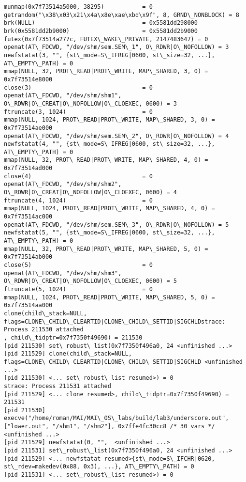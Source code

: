 \documentclass[a4paper, 12pt]{article}
\begin{document}
\begin{lstlisting}
munmap(0x7f73514a5000, 38295)           = 0
getrandom("\x38\x03\x21\x4a\x8e\xae\xbd\x9f", 8, GRND\_NONBLOCK) = 8
brk(NULL)                               = 0x5581dd298000
brk(0x5581dd2b9000)                     = 0x5581dd2b9000
futex(0x7f73514a277c, FUTEX\_WAKE\_PRIVATE, 2147483647) = 0
openat(AT\_FDCWD, "/dev/shm/sem.SEM\_1", O\_RDWR|O\_NOFOLLOW) = 3
newfstatat(3, "", {st\_mode=S\_IFREG|0600, st\_size=32, ...}, AT\_EMPTY\_PATH) = 0
mmap(NULL, 32, PROT\_READ|PROT\_WRITE, MAP\_SHARED, 3, 0) = 0x7f73514e8000
close(3)                                = 0
openat(AT\_FDCWD, "/dev/shm/shm1", O\_RDWR|O\_CREAT|O\_NOFOLLOW|O\_CLOEXEC, 0600) = 3
ftruncate(3, 1024)                      = 0
mmap(NULL, 1024, PROT\_READ|PROT\_WRITE, MAP\_SHARED, 3, 0) = 0x7f73514ae000
openat(AT\_FDCWD, "/dev/shm/sem.SEM\_2", O\_RDWR|O\_NOFOLLOW) = 4
newfstatat(4, "", {st\_mode=S\_IFREG|0600, st\_size=32, ...}, AT\_EMPTY\_PATH) = 0
mmap(NULL, 32, PROT\_READ|PROT\_WRITE, MAP\_SHARED, 4, 0) = 0x7f73514ad000
close(4)                                = 0
openat(AT\_FDCWD, "/dev/shm/shm2", O\_RDWR|O\_CREAT|O\_NOFOLLOW|O\_CLOEXEC, 0600) = 4
ftruncate(4, 1024)                      = 0
mmap(NULL, 1024, PROT\_READ|PROT\_WRITE, MAP\_SHARED, 4, 0) = 0x7f73514ac000
openat(AT\_FDCWD, "/dev/shm/sem.SEM\_3", O\_RDWR|O\_NOFOLLOW) = 5
newfstatat(5, "", {st\_mode=S\_IFREG|0600, st\_size=32, ...}, AT\_EMPTY\_PATH) = 0
mmap(NULL, 32, PROT\_READ|PROT\_WRITE, MAP\_SHARED, 5, 0) = 0x7f73514ab000
close(5)                                = 0
openat(AT\_FDCWD, "/dev/shm/shm3", O\_RDWR|O\_CREAT|O\_NOFOLLOW|O\_CLOEXEC, 0600) = 5
ftruncate(5, 1024)                      = 0
mmap(NULL, 1024, PROT\_READ|PROT\_WRITE, MAP\_SHARED, 5, 0) = 0x7f73514aa000
clone(child\_stack=NULL, flags=CLONE\_CHILD\_CLEARTID|CLONE\_CHILD\_SETTID|SIGCHLDstrace: Process 211530 attached
, child\_tidptr=0x7f7350f49690) = 211530
[pid 211530] set\_robust\_list(0x7f7350f496a0, 24 <unfinished ...>
[pid 211529] clone(child\_stack=NULL, flags=CLONE\_CHILD\_CLEARTID|CLONE\_CHILD\_SETTID|SIGCHLD <unfinished ...>
[pid 211530] <... set\_robust\_list resumed>) = 0
strace: Process 211531 attached
[pid 211529] <... clone resumed>, child\_tidptr=0x7f7350f49690) = 211531
[pid 211530] execve("/home/roman/MAI/MAI\_OS\_labs/build/lab3/underscore.out", ["lower.out", "/shm1", "/shm2"], 0x7ffe4fc30cc8 /* 30 vars */ <unfinished ...>
[pid 211529] newfstatat(0, "",  <unfinished ...>
[pid 211531] set\_robust\_list(0x7f7350f496a0, 24 <unfinished ...>
[pid 211529] <... newfstatat resumed>{st\_mode=S\_IFCHR|0620, st\_rdev=makedev(0x88, 0x3), ...}, AT\_EMPTY\_PATH) = 0
[pid 211531] <... set\_robust\_list resumed>) = 0

\end{lstlisting}
\end{document}
